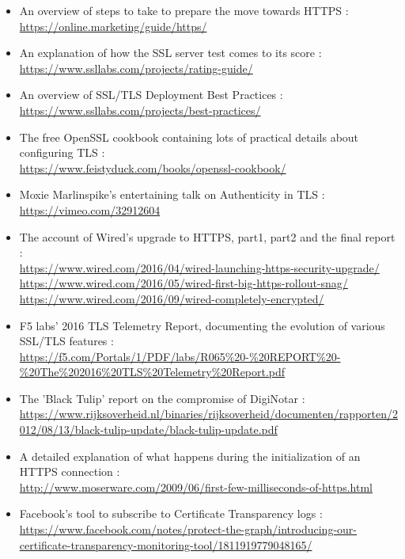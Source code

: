 \documentclass[titlepage]{article}
\begin{document}
    \begin{itemize}
        \item An overview of steps to take to prepare the move towards HTTPS :\\ \url{https://online.marketing/guide/https/}
        \item An explanation of how the SSL server test comes to its score :\\ \url{https://www.ssllabs.com/projects/rating-guide/}
        \item An overview of SSL/TLS Deployment Best Practices :\\ \url{https://www.ssllabs.com/projects/best-practices/}
        \item The free OpenSSL cookbook containing lots of practical details about configuring TLS :\\ \url{https://www.feistyduck.com/books/openssl-cookbook/}
        \item Moxie Marlinspike's entertaining talk on Authenticity in TLS :\\ \url{https://vimeo.com/32912604}
        \item The account of Wired's upgrade to HTTPS, part1, part2 and the final report :\\\url{https://www.wired.com/2016/04/wired-launching-https-security-upgrade/} \\\url{https://www.wired.com/2016/05/wired-first-big-https-rollout-snag/} \\\url{https://www.wired.com/2016/09/wired-completely-encrypted/}
        \item F5 labs' 2016 TLS Telemetry Report, documenting the evolution of various SSL/TLS features :\\ \url{https://f5.com/Portals/1/PDF/labs/R065%20-%20REPORT%20-%20The%202016%20TLS%20Telemetry%20Report.pdf}
        \item The 'Black Tulip' report on the compromise of DigiNotar :\\\url{https://www.rijksoverheid.nl/binaries/rijksoverheid/documenten/rapporten/2012/08/13/black-tulip-update/black-tulip-update.pdf}
        \item A detailed explanation of what happens during the initialization of an HTTPS connection :\\\url{http://www.moserware.com/2009/06/first-few-milliseconds-of-https.html}
        \item Facebook's tool to subscribe to Certificate Transparency logs :\\\url{https://www.facebook.com/notes/protect-the-graph/introducing-our-certificate-transparency-monitoring-tool/1811919779048165/}
    \end{itemize}
    \newpage
\end{document}
